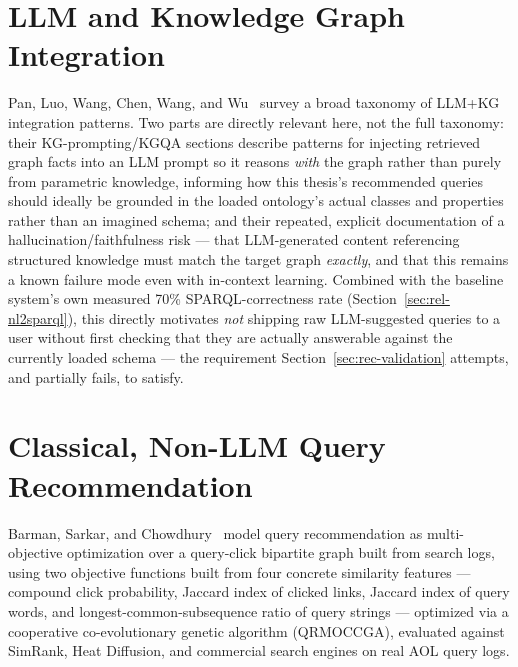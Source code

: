 \documentclass[11pt,a4paper,oneside]{book}
\begin{document}
\section{LLM and Knowledge Graph Integration}
\label{sec:rel-kgllm}

Pan, Luo, Wang, Chen, Wang, and Wu~\cite{pan2024} survey a broad taxonomy of LLM+KG integration
patterns. Two parts are directly relevant here, not the full taxonomy: their KG-prompting/KGQA
sections describe patterns for injecting retrieved graph facts into an LLM prompt so it reasons
\emph{with} the graph rather than purely from parametric knowledge, informing how this thesis's
recommended queries should ideally be grounded in the loaded ontology's actual classes and
properties rather than an imagined schema; and their repeated, explicit documentation of a
hallucination/faithfulness risk --- that LLM-generated content referencing structured knowledge
must match the target graph \emph{exactly}, and that this remains a known failure mode even with
in-context learning. Combined with the baseline system's own measured 70\% SPARQL-correctness rate
(Section~\ref{sec:rel-nl2sparql}), this directly motivates \emph{not} shipping raw LLM-suggested
queries to a user without first checking that they are actually answerable against the currently
loaded schema --- the requirement Section~\ref{sec:rec-validation} attempts, and partially fails,
to satisfy.

\section{Classical, Non-LLM Query Recommendation}
\label{sec:rel-qrmoccga}

Barman, Sarkar, and Chowdhury~\cite{barman2024} model query recommendation as multi-objective
optimization over a query-click bipartite graph built from search logs, using two objective
functions built from four concrete similarity features --- compound click probability, Jaccard
index of clicked links, Jaccard index of query words, and longest-common-subsequence ratio of query
strings --- optimized via a cooperative co-evolutionary genetic algorithm (QRMOCCGA), evaluated
against SimRank, Heat Diffusion, and commercial search engines on real AOL query logs.
\end{document}
